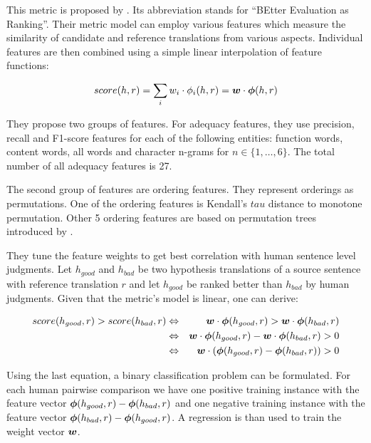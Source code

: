 This metric is proposed by . Its abbreviation
stands for ``BEtter Evaluation as Ranking''. Their metric model can employ
various features which measure the similarity of candidate and reference
translations from various aspects.  Individual features are then combined using
a simple linear interpolation of feature functions:

\begin{equation*}
    score(h,r) = \sum_i w_i \cdot \phi_i(h,r) = \boldsymbol{w} \cdot \boldsymbol{\phi}(h,r)
\end{equation*}

They propose two groups of features. For adequacy features, they use precision,
recall and F1-score features for each of the following entities: function
words, content words, all words and character n-grams for $n \in \{1, \ldots,
6\}$. The total number of all adequacy features is 27.

The second group of features are ordering features. They represent orderings as
permutations. One of the ordering features is Kendall's $tau$ distance to
monotone permutation. Other 5 ordering features are based on permutation trees
introduced by .

They tune the feature weights to get best correlation with human sentence level
judgments. Let $h_{good}$ and $h_{bad}$ be two hypothesis translations of a source
sentence with reference translation $r$ and let $h_{good}$ be ranked better than
$h_{bad}$ by human judgments.  Given that the metric's model is linear, one can
derive:

\begin{eqnarray*}
    score(h_{good},r) > score(h_{bad},r) & \Leftrightarrow & \boldsymbol{w} \cdot \boldsymbol{\phi}(h_{good},r) > \boldsymbol{w} \cdot \boldsymbol{\phi}(h_{bad},r) \\
                                         & \Leftrightarrow & \boldsymbol{w} \cdot \boldsymbol{\phi}(h_{good},r) - \boldsymbol{w} \cdot \boldsymbol{\phi}(h_{bad},r) > 0 \\
                                         & \Leftrightarrow & \boldsymbol{w} \cdot \left( \boldsymbol{\phi}(h_{good},r) - \boldsymbol{\phi}(h_{bad},r) \right) > 0
\end{eqnarray*}

Using the last equation, a binary classification problem can be formulated.  For
each human pairwise comparison we have one positive training instance with the
feature vector $\boldsymbol{\phi}(h_{good},r) - \boldsymbol{\phi}(h_{bad},r)$ and one
negative training instance with the feature vector $\boldsymbol{\phi}(h_{bad},r) -
\boldsymbol{\phi}(h_{good},r)$. A regression is than used to train the
weight vector $\boldsymbol{w}$.

